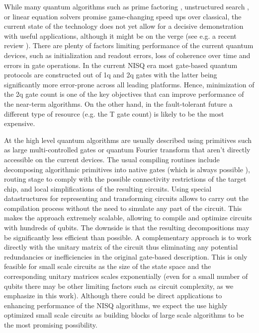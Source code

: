 \documentclass[twocolumn, amsfonts, amssymb, aps, nofootinbib]{revtex4-2}
\newcommand{\T}{T }
\begin{document}
While many quantum algorithms such as prime factoring \cite{Shor1997}, unstructured search \cite{Grover1997}, or linear equation solvers \cite{Harrow2009} promise game-changing speed ups over classical, the current state of the technology does not yet allow for a decisive demonstration with useful applications, although it might be on the verge (see e.g. a recent review \cite{Fedorov2022}). There are plenty of factors limiting performance of the current quantum devices, such as initialization and readout errors, loss of coherence over time and errors in gate operations. In the current NISQ era \cite{Preskill2018} most gate-based quantum protocols are constructed out of 1q and 2q gates with the latter being significantly more error-prone across all leading platforms. Hence, minimization of the 2q gate count is one of the key objectives that can improve performance of the near-term algorithms. On the other hand, in the fault-tolerant future a different type of resource (e.g. the \T gate count) is likely to be the most expensive.

At the high level quantum algorithms are usually described using primitives such as large multi-controlled gates or quantum Fourier transform that aren't directly accessible on the current devices. The usual compiling routines \cite{Qiskit, Sivarajah2021} include decomposing algorithmic primitives into native gates (which is always possible \cite{Barenco1995}), routing stage to comply with the possible connectivity restrictions of the target chip, and local simplifications of the resulting circuits. Using special datastructures for representing and transforming circuits allows to carry out the compilation process without the need to simulate any part of the circuit. This makes the approach extremely scalable, allowing to compile and optimize circuits with hundreds of qubits. The downside is that the resulting decompositions may be significantly less efficient than possible. A complementary approach is to work directly with the unitary matrix of the circuit thus eliminating any potential redundancies or inefficiencies in the original gate-based description. This is only feasible for small scale circuits as the size of the state space and the corresponding unitary matrices scales exponentially (even for a small number of qubits there may be other limiting factors such as circuit complexity, as we emphasize in this work). Although there could be direct applications to enhancing performance of the NISQ algorithms, we expect the use highly optimized small scale circuits as building blocks of large scale algorithms to be the most promising possibility.
\end{document}
